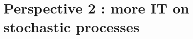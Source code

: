 \chapter{Perspective 2 : more IT on stochastic processes}\label{sec:more IT on stochastic processes}

\lipsum[1-3]